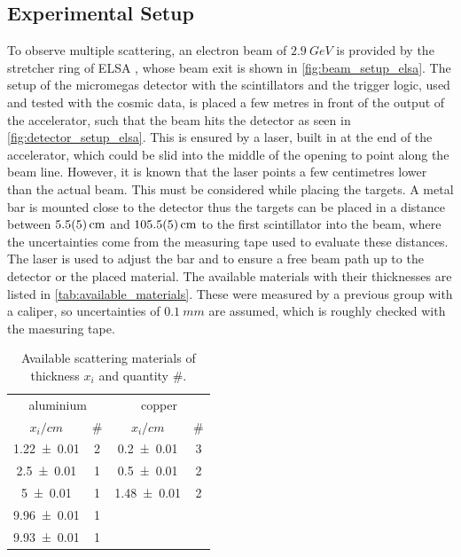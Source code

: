 \documentclass[sn-mathphys-num,iicol]{sn-jnl}
\theoremstyle{thmstyleone}
\theoremstyle{thmstyletwo}
\theoremstyle{thmstylethree}
\begin{document}
\subsection{Experimental Setup}
To observe multiple scattering, an electron beam of $\SI{2.9}{GeV}$ is provided by the stretcher ring of ELSA \cite{ELSA}, whose beam exit is shown in \autoref{fig:beam_setup_elsa}. 
The setup of the micromegas detector with the scintillators and the trigger logic, used and tested with the cosmic data, is placed a few metres in front of the output of the accelerator, such that the beam hits the detector as seen in \autoref{fig:detector_setup_elsa}. 
This is ensured by a laser, built in at the end of the accelerator, which could be slid into the middle of the opening to point along the beam line. 
However, it is known that the laser points a few centimetres lower than the actual beam. 
This must be considered while placing the targets.
A metal bar is mounted close to the detector thus the targets can be placed in a distance between $\SI{5.5\pm 0.5}{cm}$ and $\SI{105.5\pm 0.5}{cm}$ to the first scintillator into the beam, where the uncertainties come from the measuring tape used to evaluate these distances. 
The laser is used to adjust the bar and to ensure a free beam path up to the detector or the placed material.
The available materials with their thicknesses are listed in \autoref{tab:available_materials}. 
These were measured by a previous group with a caliper, so uncertainties of $\SI{0.1}{mm}$ are assumed, which is roughly checked with the maesuring tape.


\begin{table}\centering
  \renewcommand*{\arraystretch}{1.1}
  \begin{tabular}{c|c||c|c}
    \multicolumn{2}{c||}{aluminium} & \multicolumn{2}{c}{copper} \\
    {\fontsize{8}{3}\selectfont $x_i/\si{cm}$} & {\fontsize{8}{3}\selectfont \#} & {\fontsize{8}{3}\selectfont $x_i/\si{cm}$} & {\fontsize{8}{3}\selectfont \# } \\\hline \rule{0pt}{3ex}
    \num{1.22\pm 0.01} & 2 & \num{0.2\pm 0.01} & 3 \\
    \num{2.5\pm 0.01} & 1 & \num{0.5\pm 0.01} & 2 \\
    \num{5\pm 0.01} & 1 & \num{1.48\pm 0.01} & 2 \\
    \num{9.96\pm 0.01} & 1 & & \\
    \num{9.93\pm 0.01} & 1 & & \\
  \end{tabular}\vspace{3mm}
  \caption{Available scattering materials of thickness $x_i$ and quantity $\#$.}
  \label{tab:available_materials}
\end{table}
\end{document}
